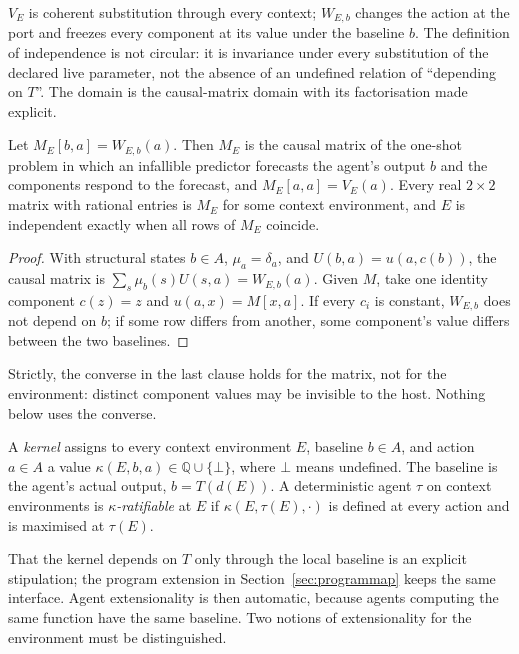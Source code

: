 $V_E$ is coherent substitution through every context; $W_{E,b}$ changes the action at the port and
freezes every component at its value under the baseline $b$. The definition of independence is not
circular: it is invariance under every substitution of the declared live parameter, not the absence
of an undefined relation of \enquote{depending on $T$}. The domain is the causal-matrix domain
with its factorisation made explicit.

\begin{proposition}\label{prop:contextmatrix}
Let $M_E[b,a]=W_{E,b}(a)$. Then $M_E$ is the causal matrix of the one-shot problem in which an
infallible predictor forecasts the agent's output $b$ and the components respond to the forecast, and
$M_E[a,a]=V_E(a)$. Every real $2\times2$ matrix with rational entries is $M_E$ for some context
environment, and $E$ is independent exactly when all rows of $M_E$ coincide.
\end{proposition}

\begin{proof}
With structural states $b\in A$, $\mu_a=\delta_a$, and $U(b,a)=u(a,c(b))$, the causal matrix is
$\sum_s\mu_b(s)U(s,a)=W_{E,b}(a)$. Given $M$, take one identity component $c(z)=z$ and $u(a,x)=M[x,a]$. If
every $c_i$ is constant, $W_{E,b}$ does not depend on $b$; if some row differs from another, some
component's value differs between the two baselines.
\end{proof}

Strictly, the converse in the last clause holds for the matrix, not for the environment: distinct
component values may be invisible to the host. Nothing below uses the converse.

\begin{definition}\label{def:kernel}
A \emph{kernel} assigns to every context environment $E$, baseline $b\in A$, and action $a\in A$ a value
$\kappa(E,b,a)\in\mathbb Q\cup\{\bot\}$, where $\bot$ means undefined. The baseline is the agent's actual
output, $b=T(d(E))$. A deterministic agent $\tau$ on context environments is
\emph{$\kappa$-ratifiable} at $E$ if $\kappa(E,\tau(E),\cdot)$ is defined at every action and is
maximised at $\tau(E)$.
\end{definition}

That the kernel depends on $T$ only through the local baseline is an explicit stipulation;
the program extension in Section~\ref{sec:programmap} keeps the same interface. Agent extensionality
is then automatic, because agents computing the same function have the same baseline. Two
notions of extensionality for the environment must be distinguished.

